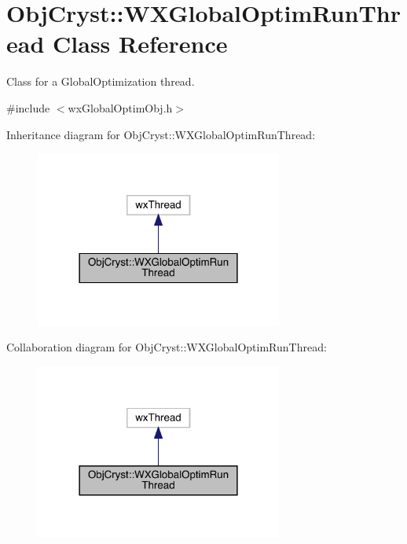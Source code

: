 \hypertarget{class_obj_cryst_1_1_w_x_global_optim_run_thread}{}\section{Obj\+Cryst\+::W\+X\+Global\+Optim\+Run\+Thread Class Reference}
\label{class_obj_cryst_1_1_w_x_global_optim_run_thread}


Class for a Global\+Optimization thread.  




{\ttfamily \#include $<$wx\+Global\+Optim\+Obj.\+h$>$}



Inheritance diagram for Obj\+Cryst\+::W\+X\+Global\+Optim\+Run\+Thread\+:
\nopagebreak
\begin{figure}[H]
\begin{center}
\leavevmode
\includegraphics[width=230pt]{class_obj_cryst_1_1_w_x_global_optim_run_thread__inherit__graph}
\end{center}
\end{figure}


Collaboration diagram for Obj\+Cryst\+::W\+X\+Global\+Optim\+Run\+Thread\+:
\nopagebreak
\begin{figure}[H]
\begin{center}
\leavevmode
\includegraphics[width=230pt]{class_obj_cryst_1_1_w_x_global_optim_run_thread__coll__graph}
\end{center}
\end{figure}
